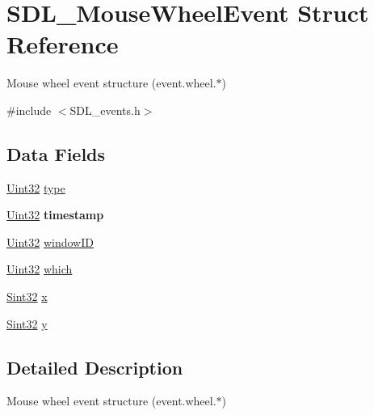 \hypertarget{struct_s_d_l___mouse_wheel_event}{}\section{S\+D\+L\+\_\+\+Mouse\+Wheel\+Event Struct Reference}
\label{struct_s_d_l___mouse_wheel_event}


Mouse wheel event structure (event.\+wheel.$\ast$)  




{\ttfamily \#include $<$S\+D\+L\+\_\+events.\+h$>$}

\subsection*{Data Fields}
\begin{DoxyCompactItemize}
\item 
\hyperlink{_s_d_l__stdinc_8h_add440eff171ea5f55cb00c4a9ab8672d}{Uint32} \hyperlink{struct_s_d_l___mouse_wheel_event_aa40a9b05c3154032b9f2d7220e9f08dc}{type}
\item 
\hyperlink{_s_d_l__stdinc_8h_add440eff171ea5f55cb00c4a9ab8672d}{Uint32} {\bfseries timestamp}\hypertarget{struct_s_d_l___mouse_wheel_event_abf1ed7edeab81db9c05d899836a44a2f}{}\label{struct_s_d_l___mouse_wheel_event_abf1ed7edeab81db9c05d899836a44a2f}

\item 
\hyperlink{_s_d_l__stdinc_8h_add440eff171ea5f55cb00c4a9ab8672d}{Uint32} \hyperlink{struct_s_d_l___mouse_wheel_event_a78d9995068d6f40cd78bb8db7351b0a1}{window\+ID}
\item 
\hyperlink{_s_d_l__stdinc_8h_add440eff171ea5f55cb00c4a9ab8672d}{Uint32} \hyperlink{struct_s_d_l___mouse_wheel_event_abd239700243abe3b42bfee05bbf65fa7}{which}
\item 
\hyperlink{_s_d_l__stdinc_8h_a7a90b941db9d4582e9ad7abb9940ff7e}{Sint32} \hyperlink{struct_s_d_l___mouse_wheel_event_a133a64253d58ecff038d427c70b5b0aa}{x}
\item 
\hyperlink{_s_d_l__stdinc_8h_a7a90b941db9d4582e9ad7abb9940ff7e}{Sint32} \hyperlink{struct_s_d_l___mouse_wheel_event_ae6c55103b58b9a5b746ae4f6fbc9c901}{y}
\end{DoxyCompactItemize}


\subsection{Detailed Description}
Mouse wheel event structure (event.\+wheel.$\ast$) 


